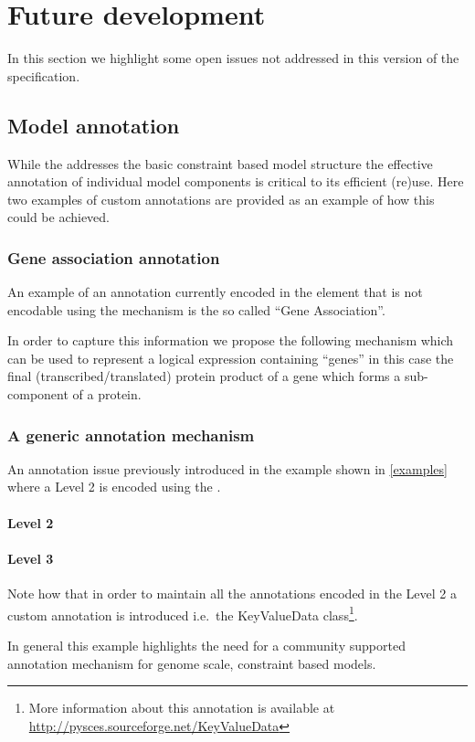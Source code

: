 
\section{Future development}
\label{future}

In this section we highlight some open issues not addressed in this version
of the \FBC specification.

\subsection{Model annotation}
While the \FBCPackage addresses the basic constraint based model structure the
effective annotation of individual model components is critical to its
efficient (re)use. Here two examples of custom annotations are provided as
an example of how this could be achieved.

\subsubsection{Gene association annotation}
An example of an annotation currently encoded in the \Notes element that is
not encodable using the \SBML \Annotation mechanism is the so called ``Gene
Association''.

In order to capture this information we propose the following mechanism
which can be used to represent a logical expression containing ``genes'' in
this case the final (transcribed/translated) protein product of a gene which
forms a sub-component of a protein.
%

\subsubsection{A generic annotation mechanism}
An annotation issue previously introduced in the example shown in
\ref{examples} where a \SBML Level 2 \Reaction is encoded using the
\FBCPackage.

\paragraph{\SBML Level 2 \Reaction}
%

\paragraph{\SBML Level 3 \Reaction}
Note how that in order to maintain all the annotations encoded in the \SBML
Level 2 \Reaction {} a custom annotation is introduced i.e.~the
\textsf{KeyValueData} class\footnote{More information about this annotation
is available at \url{http://pysces.sourceforge.net/KeyValueData}}.

In general this example highlights the need for a community supported
annotation mechanism for genome scale, constraint based models.
%
